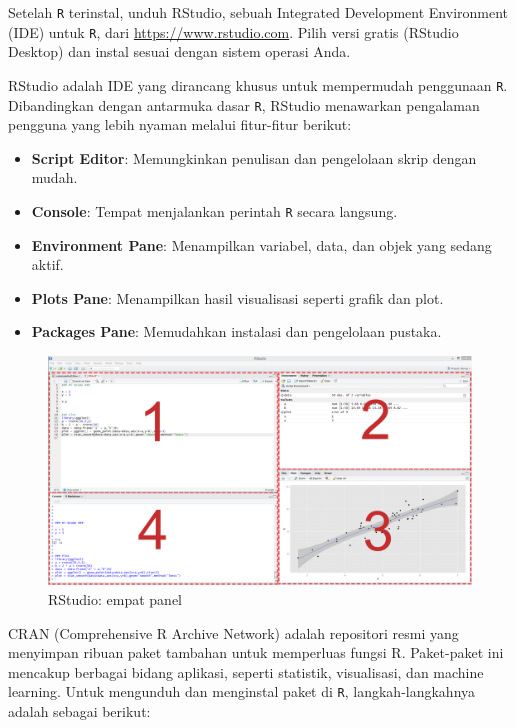 \documentclass[
  oneside]{book}
\begin{document}
Setelah \texttt{R} terinstal, unduh RStudio, sebuah Integrated
Development Environment (IDE) untuk \texttt{R}, dari
\url{https://www.rstudio.com}. Pilih versi gratis (RStudio Desktop) dan
instal sesuai dengan sistem operasi Anda.

RStudio adalah IDE yang dirancang khusus untuk mempermudah penggunaan
\texttt{R}. Dibandingkan dengan antarmuka dasar \texttt{R},
RStudio menawarkan pengalaman pengguna yang lebih nyaman melalui
fitur-fitur berikut:

\begin{itemize}
\item
  \textbf{Script Editor}: Memungkinkan penulisan dan pengelolaan skrip
  dengan mudah.
\item
  \textbf{Console}: Tempat menjalankan perintah \texttt{R} secara
  langsung.
\item
  \textbf{Environment Pane}: Menampilkan variabel, data, dan objek yang
  sedang aktif.
\item
  \textbf{Plots Pane}: Menampilkan hasil visualisasi seperti grafik dan
  plot.
\item
  \textbf{Packages Pane}: Memudahkan instalasi dan pengelolaan pustaka.
\end{itemize}

\begin{figure}[h]

{\centering \includegraphics[width=0.8\linewidth]{images/rstudio} 

}

\caption{RStudio: empat panel}\label{fig:unnamed-chunk-4}
\end{figure}

CRAN (Comprehensive R Archive Network) adalah repositori resmi yang
menyimpan ribuan paket tambahan untuk memperluas fungsi R. Paket-paket
ini mencakup berbagai bidang aplikasi, seperti statistik, visualisasi,
dan machine learning. Untuk mengunduh dan menginstal paket di
\texttt{R}, langkah-langkahnya adalah sebagai berikut:
\end{document}
